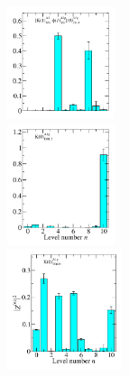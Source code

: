 \begin{figure}
  \includegraphics[width=0.28\textwidth]{figures/spectrum_a1g/no_tq/zfactors/zfactor_isodoublet_kaon_phi-A1g_1-P001-A2-SS_1-P00-1-A2p-SS_1.pdf}\\
  \includegraphics[width=0.28\textwidth]{figures/spectrum_a1g/no_tq/zfactors/zfactor_kaon-P000-A1g_1-DDL_2.pdf}\\
  \includegraphics[width=0.3\textwidth]{figures/spectrum_a1g/no_tq/zfactors/zfactor_kaon-P000-A1g_1-TDO_3.pdf}

\end{figure}
